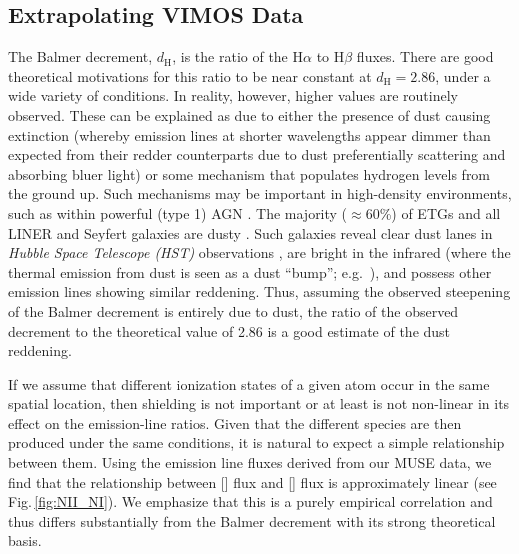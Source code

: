 	\subsection{Extrapolating VIMOS Data}
		\label{subsec:Ndec}

		The Balmer decrement, $d_\mathrm{H}$, is the ratio of the H$\alpha$ to H$\beta$ fluxes. There are good theoretical motivations for this ratio to be near constant at $d_\mathrm{H} = 2.86$, under a wide variety of conditions. In reality, however, higher values are routinely observed. These can be explained as due to either the presence of dust causing extinction (whereby emission lines at shorter wavelengths appear dimmer than expected from their redder counterparts due to dust preferentially scattering and absorbing bluer light) or some mechanism that populates hydrogen levels from the ground up. Such mechanisms may be important in high-density environments, such as within powerful (type 1) AGN \citep[e.g.][]{Shields1974, Netzer1975}. 
		The majority ($\approx 60$\%) of ETGs and all LINER and Seyfert galaxies are dusty \citep[e.g.][]{Martini2013}. 
		Such galaxies reveal clear dust lanes in \textit{Hubble Space Telescope (HST)} observations \citep[e.g.][]{Martini2013}, are bright in the infrared (where the thermal emission from dust is seen as a dust ``bump''; e.g.\ \citealt{Jura1987, Knapp1992}), and possess other emission lines \citep[e.g.\ ;][]{Wampler1968} showing similar reddening. Thus, assuming the observed steepening of the Balmer decrement is entirely due to dust, the ratio of the observed decrement to the theoretical value of 2.86 is a good estimate of the dust reddening.

		If we assume that different ionization states of a given atom occur in the same spatial location, then shielding is not important or at least is not non-linear in its effect on the emission-line ratios. Given that the different species are then produced under the same conditions, it is natural to expect a simple relationship between them. Using the emission line fluxes derived from our MUSE data, we find that the relationship between [] flux and [] flux is approximately linear (see Fig.\,\ref{fig:NII_NI}). We emphasize that this is a purely empirical correlation and thus differs substantially from the Balmer decrement with its strong theoretical basis. 

